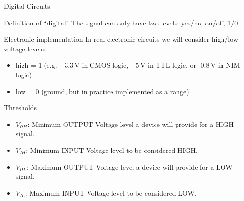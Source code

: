 \documentclass[beamer]{standalone}
\begin{document}
\begin{frame}{Digital Circuits}
\begin{block}{Definition of ``digital''}
The signal can only have two levels: yes/no, on/off, 1/0
\end{block}
\begin{block}{Electronic implementation}
In real electronic circuits we will consider high/low voltage levels:
\begin{itemize}
\item high = 1 (e.g. +3.3\,V in CMOS logic, +5\,V in TTL logic, or -0.8\,V in NIM logic)
\item low = 0 (ground, but in practice implemented as a range)
\end{itemize}
\end{block}
\begin{block}{Thresholds}
\begin{itemize}
\item $V_{OH}$: Minimum OUTPUT Voltage level a device will provide for a HIGH signal.
\item $V_{IH}$: Minimum INPUT Voltage level to be considered HIGH.
\item $V_{OL}$: Maximum OUTPUT Voltage level a device will provide for a LOW signal.
\item $V_{IL}$: Maximum INPUT Voltage level to be considered LOW.
\end{itemize}
\end{block}
\end{frame}
\end{document}
